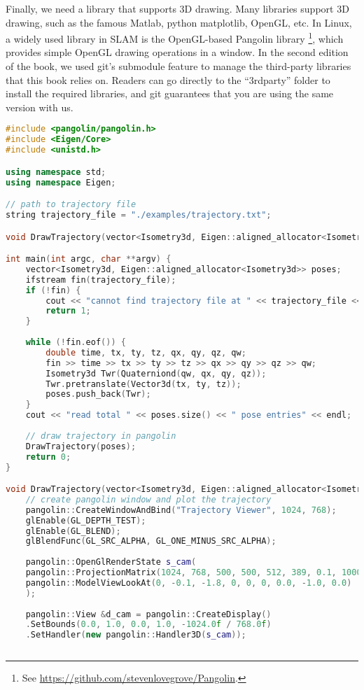 Finally, we need a library that supports 3D drawing. Many libraries support 3D drawing, such as the famous Matlab, python matplotlib, OpenGL, etc. In Linux, a widely used library in SLAM is the OpenGL-based Pangolin library \footnote{See \url {https://github.com/stevenlovegrove/Pangolin}.}, which provides simple OpenGL drawing operations in a window. In the second edition of the book, we used git's submodule feature to manage the third-party libraries that this book relies on. Readers can go directly to the ``3rdparty'' folder to install the required libraries, and git guarantees that you are using the same version with us.

\begin{lstlisting}[language=c++,caption=slambook2/ch3/examples/plotTrajectory.cpp]
#include <pangolin/pangolin.h>
#include <Eigen/Core>
#include <unistd.h>

using namespace std;
using namespace Eigen;

// path to trajectory file
string trajectory_file = "./examples/trajectory.txt";

void DrawTrajectory(vector<Isometry3d, Eigen::aligned_allocator<Isometry3d>>);

int main(int argc, char **argv) {
	vector<Isometry3d, Eigen::aligned_allocator<Isometry3d>> poses;
	ifstream fin(trajectory_file);
	if (!fin) {
		cout << "cannot find trajectory file at " << trajectory_file << endl;
		return 1;
	}
	
	while (!fin.eof()) {
		double time, tx, ty, tz, qx, qy, qz, qw;
		fin >> time >> tx >> ty >> tz >> qx >> qy >> qz >> qw;
		Isometry3d Twr(Quaterniond(qw, qx, qy, qz));
		Twr.pretranslate(Vector3d(tx, ty, tz));
		poses.push_back(Twr);
	}
	cout << "read total " << poses.size() << " pose entries" << endl;
	
	// draw trajectory in pangolin
	DrawTrajectory(poses);
	return 0;
}

void DrawTrajectory(vector<Isometry3d, Eigen::aligned_allocator<Isometry3d>> poses) {
	// create pangolin window and plot the trajectory
	pangolin::CreateWindowAndBind("Trajectory Viewer", 1024, 768);
	glEnable(GL_DEPTH_TEST);
	glEnable(GL_BLEND);
	glBlendFunc(GL_SRC_ALPHA, GL_ONE_MINUS_SRC_ALPHA);
	
	pangolin::OpenGlRenderState s_cam(
	pangolin::ProjectionMatrix(1024, 768, 500, 500, 512, 389, 0.1, 1000),
	pangolin::ModelViewLookAt(0, -0.1, -1.8, 0, 0, 0, 0.0, -1.0, 0.0)
	);
	
	pangolin::View &d_cam = pangolin::CreateDisplay()
	.SetBounds(0.0, 1.0, 0.0, 1.0, -1024.0f / 768.0f)
	.SetHandler(new pangolin::Handler3D(s_cam));
	

\end{lstlisting}
